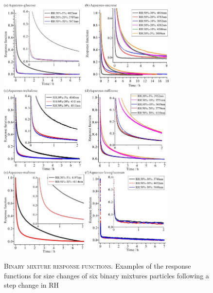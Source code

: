 \begin{figure}
    \centering
    \caption[Binary mixture response functions]{\textsc{Binary mixture response functions}. Examples of the response functions for size changes of six binary mixtures particles following a step change in RH}
    \includegraphics[width=0.8\textwidth]{chapters/water_hopping/figures/image004.jpg}
    \label{fig:wat_s2}
\end{figure}

